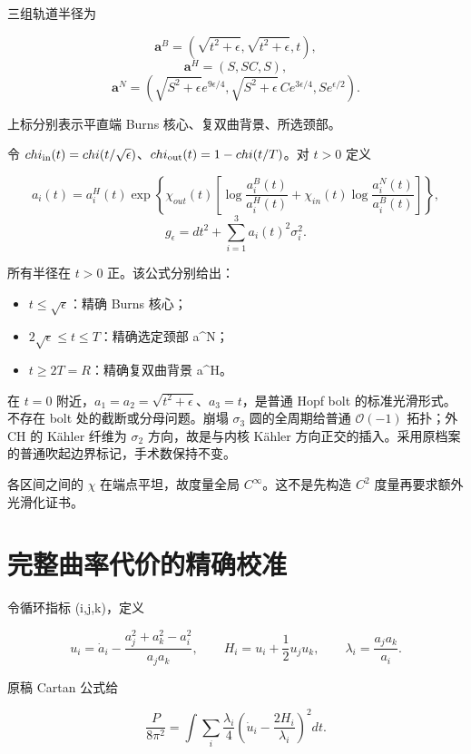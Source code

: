\documentclass[UTF8,11pt,openany,oneside,fontset=none]{ctexbook}
\providecommand{\tightlist}{\setlength{\itemsep}{1pt}\setlength{\parskip}{0pt}}
\begin{document}
三组轨道半径为

\[
\mathbf a^B=(\sqrt{t^2+\epsilon},\sqrt{t^2+\epsilon},t),
\] \[
\mathbf a^H=(S,SC,S),
\] \[
\mathbf a^N=
\left(\sqrt{S^2+\epsilon}e^{9\epsilon/4},
\sqrt{S^2+\epsilon}\,C e^{3\epsilon/4},
S e^{\epsilon/2}\right).
\]

上标分别表示平直端 Burns 核心、复双曲背景、所选颈部。

令 \(\chi_{\rm in}(t)=\chi(t/\sqrt\epsilon)\)、\(\chi_{\rm out}(t)=1-\chi(t/T)\)。对 \(t>0\) 定义

\[
 a_i(t)=a_i^H(t)\exp\left\{
 \chi_{out}(t)\left[
 \log\frac{a_i^B(t)}{a_i^H(t)}+
 \chi_{in}(t)\log\frac{a_i^N(t)}{a_i^B(t)}
 \right]\right\},
\] \[
 g_\epsilon=dt^2+\sum_{i=1}^3a_i(t)^2\sigma_i^2.
\tag{9.2}\label{eq:r9:2}
\]

所有半径在 \(t>0\) 正。该公式分别给出：

\begin{itemize}
\tightlist
\item
  \(t\le\sqrt\epsilon\)：精确 Burns 核心；
\item
  \(2\sqrt\epsilon\le t\le T\)：精确选定颈部 a\^{}N；
\item
  \(t\ge2T=R\)：精确复双曲背景 a\^{}H。
\end{itemize}

在 \(t=0\) 附近，\(a_1=a_2=\sqrt{t^2+\epsilon}\)、\(a_3=t\)，是普通 Hopf bolt 的标准光滑形式。不存在 bolt 处的截断或分母问题。崩塌 \(\sigma_3\) 圆的全周期给普通 \(\mathcal O(-1)\) 拓扑；外 CH 的 Kähler 纤维为 \(\sigma_2\) 方向，故是与内核 Kähler 方向正交的插入。采用原档案的普通吹起边界标记，手术数保持不变。

各区间之间的 \(\chi\) 在端点平坦，故度量全局 \(C^\infty\)。这不是先构造 \(C^2\) 度量再要求额外光滑化证书。

\section{完整曲率代价的精确校准}\label{ch9:ux5b8cux6574ux66f2ux7387ux4ee3ux4ef7ux7684ux7cbeux786eux6821ux51c6}

令循环指标 (i,j,k)，定义

\[
 u_i=\dot a_i-\frac{a_j^2+a_k^2-a_i^2}{a_ja_k},\qquad
 H_i=u_i+\frac12u_ju_k,\qquad
 \lambda_i=\frac{a_ja_k}{a_i}.
\]

原稿 Cartan 公式给

\[
\frac{P}{8\pi^2}=\int\sum_i\frac{\lambda_i}{4}
 \left(\dot u_i-\frac{2H_i}{\lambda_i}\right)^2dt.
\tag{9.3}\label{eq:r9:3}
\]
\end{document}
